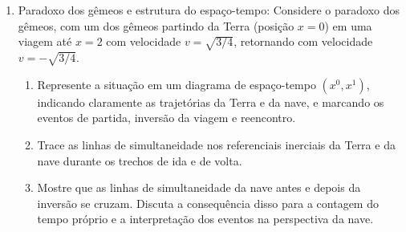 \begin{enumerate}
            \begin{enumerate}
                  \item Calcule a separação invariante $\Delta s^2$ entre os eventos $A$
                        e $B$ usando a métrica de Minkowski $\eta_{\mu\nu} =
                              \mathrm{diag}(-1, 1)$ e classifique a separação (tipo tempo, tipo
                        espaço ou nula).

                  \item Determine a velocidade $v$ de um referencial inercial $S'$ em
                        que os eventos $A$ e $B$ são simultâneos (i.e., ocorrem no mesmo
                        instante em $S'$).

                  \item Qual evento ocorre primeiro no referencial $S$? E no referencial
                        $S'$ com a velocidade obtida no item (b)? Interprete o resultado à luz
                        da relatividade da simultaneidade.
                  \item Qual a ordem dos eventos se fizermos outra transformação com velocidade
                        maior ou menor que a obtida no item (b)?
            \end{enumerate}

      \item Paradoxo dos gêmeos e estrutura do espaço-tempo: Considere o paradoxo dos
            gêmeos, com um dos gêmeos partindo da Terra (posição $x = 0$) em uma viagem
            até $x = 2$ com velocidade $v = \sqrt{3/4}$, retornando com velocidade $v =
                  -\sqrt{3/4}$.

            \begin{enumerate}
                  \item Represente a situação em um diagrama de espaço-tempo $(x^0,
                              x^1)$, indicando claramente as trajetórias da Terra e da nave, e
                        marcando os eventos de partida, inversão da viagem e reencontro.

                  \item Trace as linhas de simultaneidade nos referenciais inerciais da
                        Terra e da nave durante os trechos de ida e de volta.

                  \item Mostre que as linhas de simultaneidade da nave antes e depois da
                        inversão se cruzam. Discuta a consequência disso para a contagem
                        do tempo próprio e a interpretação dos eventos na perspectiva da
                        nave.


\end{enumerate}
\end{enumerate}
